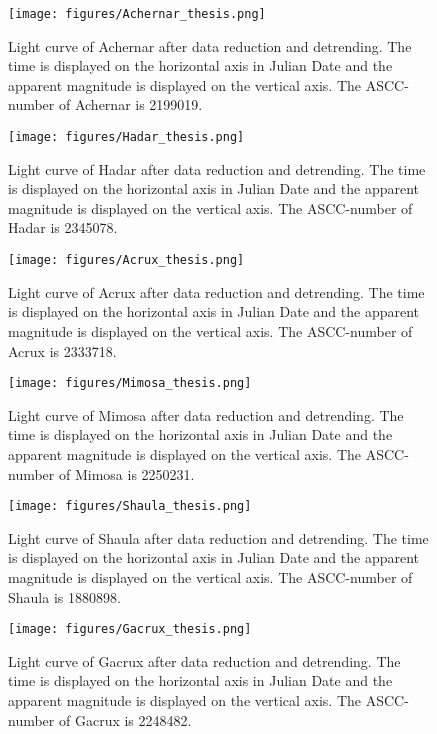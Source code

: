 \documentclass[onecolumn]{aa} %
\begin{document}
\begin{enumerate}
\begin{figure}
    \centering
    \texttt{[image: figures/Achernar\_thesis.png]}
    \caption{Light curve of Achernar after data reduction and detrending. The time is displayed on the horizontal axis in Julian Date and the apparent magnitude is displayed on the vertical axis. The ASCC-number of Achernar is 2199019.}
    \label{Achernar}
\end{figure}

\begin{figure}
    \centering
    \texttt{[image: figures/Hadar\_thesis.png]}
    \caption{Light curve of Hadar after data reduction and detrending. The time is displayed on the horizontal axis in Julian Date and the apparent magnitude is displayed on the vertical axis. The ASCC-number of Hadar is 2345078.}
    \label{Hadar}
\end{figure}

\begin{figure}
    \centering
    \texttt{[image: figures/Acrux\_thesis.png]}
    \caption{Light curve of Acrux after data reduction and detrending. The time is displayed on the horizontal axis in Julian Date and the apparent magnitude is displayed on the vertical axis. The ASCC-number of Acrux is 2333718.}
    \label{Acrux}
\end{figure}

\begin{figure}
    \centering
    \texttt{[image: figures/Mimosa\_thesis.png]}
    \caption{Light curve of Mimosa after data reduction and detrending. The time is displayed on the horizontal axis in Julian Date and the apparent magnitude is displayed on the vertical axis. The ASCC-number of Mimosa is 2250231.}
    \label{Mimosa}
\end{figure}

\begin{figure}
    \centering
    \texttt{[image: figures/Shaula\_thesis.png]}
    \caption{Light curve of Shaula after data reduction and detrending. The time is displayed on the horizontal axis in Julian Date and the apparent magnitude is displayed on the vertical axis. The ASCC-number of Shaula is 1880898.}
    \label{Shaula}
\end{figure}

\begin{figure}
    \centering
    \texttt{[image: figures/Gacrux\_thesis.png]}
    \caption{Light curve of Gacrux after data reduction and detrending. The time is displayed on the horizontal axis in Julian Date and the apparent magnitude is displayed on the vertical axis. The ASCC-number of Gacrux is 2248482.}
    \label{Gacrux}
\end{figure}


\end{enumerate}
\end{document}
